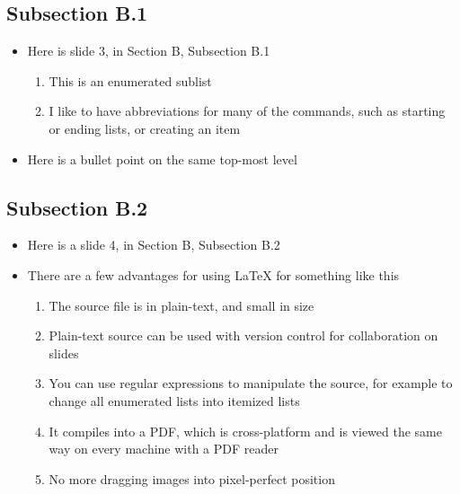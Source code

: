 \documentclass{beamer}
\begin{document}
 \subsection{Subsection B.1}

 \begin{frame}
   \begin{itemize}
     \item Here is slide 3, in Section B, Subsection B.1
     \begin{enumerate}
       \item This is an enumerated sublist
       \item I like to have abbreviations for many of the commands, such
             as starting or ending lists, or creating an item
     \end{enumerate}
     \item Here is a bullet point on the same top-most level
   \end{itemize}
 \end{frame}

 \subsection{Subsection B.2}

 \begin{frame}
   \begin{itemize}
     \item Here is a slide 4, in Section B, Subsection B.2
     \item There are a few advantages for using LaTeX for something like this
     \begin{enumerate}
       \item The source file is in plain-text, and small in size
       \item Plain-text source can be used with version control for
             collaboration on slides
       \item You can use regular expressions to manipulate the source,
             for example to change all enumerated lists into itemized
             lists
       \item It compiles into a PDF, which is cross-platform and is viewed
             the same way on every machine with a PDF reader
       \item No more dragging images into pixel-perfect position
     \end{enumerate}
   \end{itemize}
 \end{frame}
\end{document}
